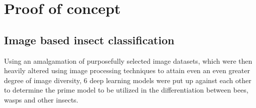 \documentclass[12pt]{article}
\begin{document}
	\section{Proof of concept}
	\subsection{Image based insect classification}
	Using an amalgamation of purposefully selected image datasets, which were then heavily altered using image processing techniques to attain even an even greater degree of image diversity, 6 deep learning models were put up against each other to determine the prime model to be utilized in the differentiation between bees, wasps and other insects.
	
	\newpage
	\begin{enumerate}
		

\end{enumerate}
\end{document}
